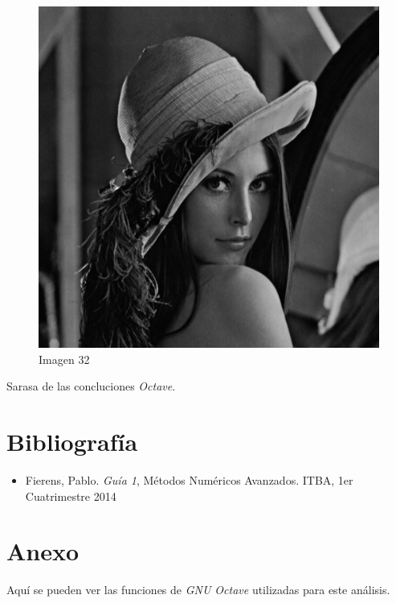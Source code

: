 \documentclass{article}
\begin{document}
\begin{multicols}{2}
\begin{figure}[H]
\centering
\includegraphics[scale=0.2]{../img/lena512.png}
\caption{Imagen 32}
\label{Imagen 32}
\end{figure}


\par Sarasa de las concluciones \textit{Octave}.\\

\end{multicols}

\section{Bibliografía} 

\begin{itemize}
  \item Fierens, Pablo. \textit{Guía 1}, Métodos Numéricos Avanzados. ITBA, 1er Cuatrimestre 2014

\end{itemize}

\clearpage

\section{Anexo}
\par Aquí se pueden ver las funciones de \textit{GNU Octave} utilizadas para este análisis.\\
\end{document}
